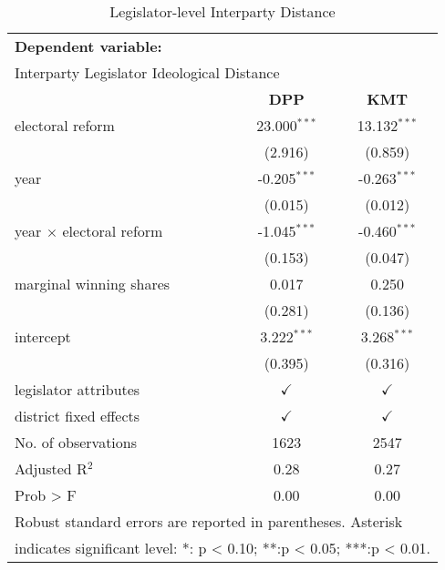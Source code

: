 
\begin{table}[H]
\caption{Legislator-level Interparty Distance\label{tab:Inter_DM}}
\centering{}%
\begin{tabular}{lcc}
    \toprule 
    \multicolumn{3}{l}{\textbf{Dependent variable:}}                          \tabularnewline
    \multicolumn{3}{l}{Interparty Legislator Ideological Distance}           \tabularnewline
    \midrule
                                & \textbf{DPP} & \textbf{KMT}                 \tabularnewline
    \midrule
electoral reform                & 23.000$^{***}$ & 13.132$^{***}$             \tabularnewline
                                & (2.916)        & (0.859)                    \tabularnewline
year                            & -0.205$^{***}$ & -0.263$^{***}$             \tabularnewline
                                & (0.015)        & (0.012)                    \tabularnewline
year $\times$ electoral reform  & -1.045$^{***}$ &  -0.460$^{***}$            \tabularnewline
                                & (0.153) & (0.047)                           \tabularnewline
marginal winning shares         & 0.017       & 0.250                         \tabularnewline
                                & (0.281)       & (0.136)                     \tabularnewline
intercept                       & 3.222$^{***}$ & 3.268$^{***}$               \tabularnewline
                                & (0.395)       & (0.316)                     \tabularnewline
legislator attributes           &     $\checkmark$    & $\checkmark$          \tabularnewline
district fixed effects          &     $\checkmark$    & $\checkmark$          \tabularnewline
    \midrule
No. of observations             & 1623          & 2547                        \tabularnewline
Adjusted R$^{2}$                & 0.28          & 0.27                        \tabularnewline
Prob > F                        & 0.00          & 0.00                        \tabularnewline
    \midrule
\multicolumn{3}{l}{{\footnotesize{}Robust standard errors are reported in parentheses. Asterisk}}   
                                                                              \tabularnewline
\multicolumn{3}{l}{{\footnotesize{}indicates significant level: {*}: p < 0.10; {*}{*}:p < 0.05; {*}{*}{*}:p < 0.01.}}                                                                                               \tabularnewline
\end{tabular}
\end{table}